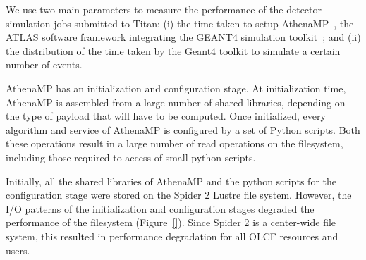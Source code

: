 We use two main parameters to measure the performance of the detector simulation
jobs submitted to Titan: (i) the time taken to setup
AthenaMP~\cite{aad2010atlas}, the ATLAS software framework integrating the
GEANT4 simulation toolkit~\cite{agostinelli2003geant4}; and (ii) the
distribution of the time taken by the Geant4 toolkit to simulate a certain
number of events.

AthenaMP has an initialization and configuration stage. At initialization time,
AthenaMP is assembled from a large number of shared libraries, depending on the
type of payload that will have to be computed. Once initialized, every algorithm
and service of AthenaMP is configured by a set of Python scripts. Both these
operations result in a large number of read operations on the filesystem,
including those required to access of small python scripts.





Initially, all the shared libraries of AthenaMP and the python scripts for the
configuration stage were stored on the Spider 2 Lustre file system. However, the
I/O patterns of the initialization and configuration stages degraded the
performance of the filesystem (Figure~\ref{}). Since Spider 2 is a
center-wide file system, this resulted in  performance degradation for all OLCF
resources and users. 

